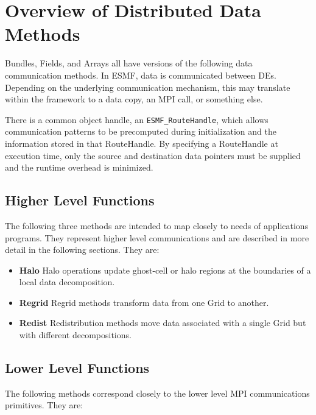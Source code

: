 
\section{Overview of Distributed Data Methods}

Bundles, Fields, and Arrays all have versions of the following
data communication methods.  In ESMF, data is communicated 
between DEs.  Depending on the underlying communication 
mechanism, this may translate within the framework to a data 
copy, an MPI call, or something else.

There is a common object handle, an {\tt ESMF\_RouteHandle}, which
allows communication patterns to be precomputed during 
initialization and the information stored in that RouteHandle.
By specifying a RouteHandle at execution time, only
the source and destination data pointers must be supplied and the
runtime overhead is minimized.

\subsection{Higher Level Functions}
The following three methods are intended to map closely to 
needs of applications programs.  They represent higher level
communications and are described in more detail in the following
sections.  They are:

\begin{itemize}

\item {\bf Halo}
Halo operations update ghost-cell or halo regions at the boundaries
of a local data decomposition.
\item {\bf Regrid}
Regrid methods transform data from one Grid to another.
\item {\bf Redist}
Redistribution methods move data associated with a single Grid but
with different decompositions.

\end{itemize}

\subsection{Lower Level Functions}
The following methods correspond closely to the lower level
MPI communications primitives.  They are:

